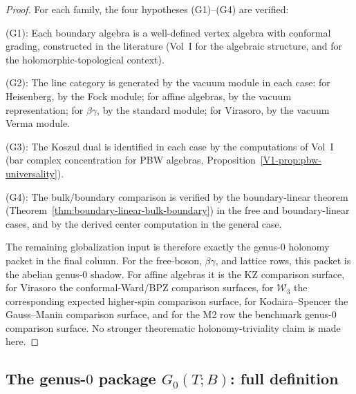 \begin{proof}
For each family, the four hypotheses (G1)--(G4) are verified:

(G1): Each boundary algebra is a well-defined vertex algebra with
conformal grading, constructed in the literature
(Vol~I for the algebraic structure, \cite{CDG20} and
\cite{DNP25} for the holomorphic-topological context).

(G2): The line category is generated by the vacuum module in each
case: for Heisenberg, by the Fock module; for affine algebras, by
the vacuum representation; for $\beta\gamma$, by the standard
module; for Virasoro, by the vacuum Verma module.

(G3): The Koszul dual is identified in each case by the computations
of Vol~I (bar complex concentration for PBW algebras,
Proposition~\ref*{V1-prop:pbw-universality}).

(G4): The bulk/boundary comparison is verified by the
boundary-linear theorem (Theorem~\ref{thm:boundary-linear-bulk-boundary})
in the free and boundary-linear cases, and by the derived center
computation in the general case.

The remaining globalization input is therefore exactly the
genus-$0$ holonomy packet in the final column. For the free-boson,
$\beta\gamma$, and lattice rows, this packet is the abelian
genus-$0$ shadow. For affine algebras it is the KZ comparison
surface, for Virasoro the conformal-Ward/BPZ comparison surfaces,
for $\mathcal{W}_3$ the corresponding expected higher-spin
comparison surface, for Kodaira--Spencer the Gauss--Manin
comparison surface, and for the M2 row the benchmark genus-$0$
comparison surface. No stronger theorematic holonomy-triviality
claim is made here.
\end{proof}


\subsection{The genus-\texorpdfstring{$0$}{0} package \texorpdfstring{$G_0(T;B)$}{G\_0(T;B)}: full definition}


